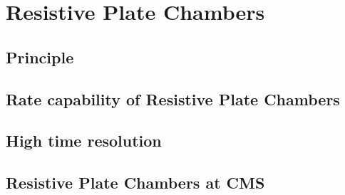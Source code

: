 \graphicspath{{chapt_dutch/}{intro/}{chapt2/}{chapt3/}{chapt4/}{chapt5/}{chapt6/}{chapt7/}}

\renewcommand\evenpagerightmark{{\scshape\small Chapter 4}}
\renewcommand\oddpageleftmark{{\scshape\small Resistive Plate Chambers}}

\renewcommand{\bibname}{References}

\hyphenation{}

\chapter[Resistive Plate Chambers]%
{Resistive Plate Chambers}
\label{chapt:4}

\section{Principle}
\label{sec:principle}

\section{Rate capability of Resistive Plate Chambers}
\label{sec:RateCapa}

\section{High time resolution}
\label{sec:TimeRes}

\section{Resistive Plate Chambers at CMS}
\label{sec:CMS-RPC}

\clearpage{\pagestyle{empty}\cleardoublepage}
